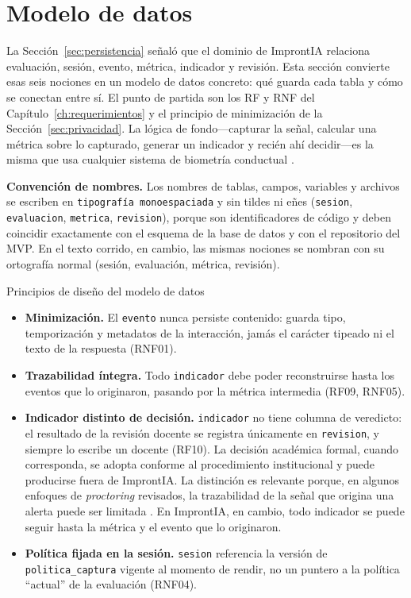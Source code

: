 \section{Modelo de datos}
\label{sec:modelo_datos}

La Sección~\ref{sec:persistencia} señaló que el dominio de ImprontIA relaciona evaluación, sesión, evento, métrica, indicador y revisión. Esta sección convierte esas seis nociones en un modelo de datos concreto: qué guarda cada tabla y cómo se conectan entre sí. El punto de partida son los RF y RNF del Capítulo~\ref{ch:requerimientos} y el principio de minimización de la Sección~\ref{sec:privacidad}. La lógica de fondo---capturar la señal, calcular una métrica sobre lo capturado, generar un indicador y recién ahí decidir---es la misma que usa cualquier sistema de biometría conductual \parencite{Jain2004, Yampolskiy2008}.

\textbf{Convención de nombres.} Los nombres de tablas, campos, variables y archivos se escriben en \texttt{tipografía monoespaciada} y sin tildes ni eñes (\texttt{sesion}, \texttt{evaluacion}, \texttt{metrica}, \texttt{revision}), porque son identificadores de código y deben coincidir exactamente con el esquema de la base de datos y con el repositorio del MVP. En el texto corrido, en cambio, las mismas nociones se nombran con su ortografía normal (sesión, evaluación, métrica, revisión).

\clearpage
\begin{keyfinding}{Principios de diseño del modelo de datos}
\begin{itemize}
    \item \textbf{Minimización.} El \texttt{evento} nunca persiste contenido: guarda tipo, temporización y metadatos de la interacción, jamás el carácter tipeado ni el texto de la respuesta (RNF01).
    \item \textbf{Trazabilidad íntegra.} Todo \texttt{indicador} debe poder reconstruirse hasta los eventos que lo originaron, pasando por la métrica intermedia (RF09, RNF05).
    \item \textbf{Indicador distinto de decisión.} \texttt{indicador} no tiene columna de veredicto: el resultado de la revisión docente se registra únicamente en \texttt{revision}, y siempre lo escribe un docente (RF10). La decisión académica formal, cuando corresponda, se adopta conforme al procedimiento institucional y puede producirse fuera de ImprontIA. La distinción es relevante porque, en algunos enfoques de \textit{proctoring} revisados, la trazabilidad de la señal que origina una alerta puede ser limitada \parencite{Heinrich2025}. En ImprontIA, en cambio, todo indicador se puede seguir hasta la métrica y el evento que lo originaron.
    \item \textbf{Política fijada en la sesión.} \texttt{sesion} referencia la versión de \texttt{politica\_captura} vigente al momento de rendir, no un puntero a la política ``actual'' de la evaluación (RNF04).
\end{itemize}
\end{keyfinding}

